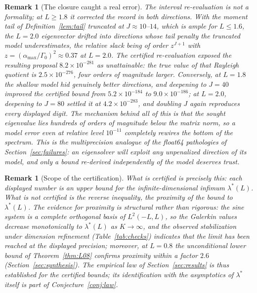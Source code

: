 ﻿\documentclass[11pt]{article}
\newtheorem{remark}[theorem]{Remark}
\newcommand{\lmin}{\lambda^{*}}
\begin{document}
\begin{remark}[The closure caught a real error]\label{rem:caught}
The interval re-evaluation is not a formality; at $L\ge1.8$ it
corrected the record in both directions.  With the moment tail of
Definition~\ref{lem:tail} truncated at $J\approx10$--$14$, which is
ample for $L\le1.6$, the $L=2.0$ eigenvector drifted into directions
whose tail penalty the truncated model underestimates, the relative
slack being of order $z^{J+1}$ with
$z=(\alpha_{\max}/\Gamma_0)^{2}\approx0.37$ at $L=2.0$.  The certified
re-evaluation exposed the resulting proposal $8.2\times10^{-281}$ as
unattainable: the true value of that Rayleigh quotient is
$2.5\times10^{-276}$, four orders of magnitude larger.  Conversely, at
$L=1.8$ the shallow model hid genuinely better directions, and
deepening to $J=40$ improved the certified bound from
$5.2\times10^{-184}$ to $9.0\times10^{-186}$; at $L=2.0$, deepening to
$J=80$ settled it at $4.2\times10^{-283}$, and doubling $J$ again
reproduces every displayed digit.  The mechanism behind all of this is
that the sought eigenvalue lies hundreds of orders of magnitude below
the matrix norm, so a model error even at relative level $10^{-11}$
completely rewires the bottom of the spectrum.  This is the
multiprecision analogue of the float64 pathologies of
Section~\ref{sec:failures}: an eigensolver will exploit any
unpenalized direction of its model, and only a bound re-derived
independently of the model deserves trust.
\end{remark}

\begin{remark}[Scope of the certification]\label{rem:scope}
What is certified is precisely this: each displayed number is an upper
bound for the infinite-dimensional infimum $\lmin(L)$.  What is not
certified is the reverse inequality, the proximity of the bound to
$\lmin(L)$.  The evidence for proximity is structural
rather than rigorous: the sine system is a complete orthogonal basis
of $L^2(-L,L)$, so the Galerkin values decrease monotonically to
$\lmin(L)$ as $K\to\infty$, and the observed stabilization under
dimension refinement (Table~\ref{tab:checks}) indicates that the limit
has been reached at the displayed precision; moreover, at $L=0.8$ the
unconditional lower bound of Theorem~\ref{thm:L08} confirms proximity
within a factor $2.6$ (Section~\ref{sec:synthesis}).  The empirical
law of Section~\ref{sec:results} is thus established for the certified
bounds; its identification with the asymptotics of $\lmin$ itself is
part of Conjecture~\ref{conj:law}.
\end{remark}
\end{document}
